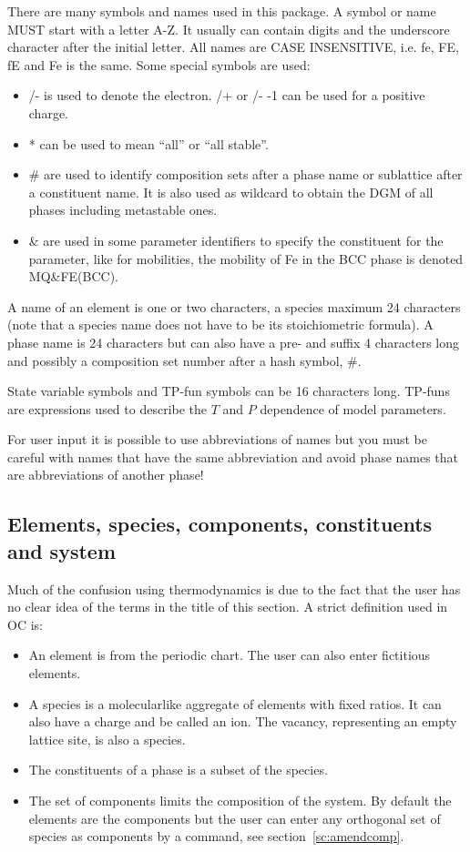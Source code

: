 \documentclass[11pt]{article}
\begin{document}
There are many symbols and names used in this package.  A symbol or
name MUST start with a letter A-Z.  It usually can contain digits and
the underscore character after the initial letter.  All names are CASE
INSENSITIVE, i.e. fe, FE, fE and Fe is the same.  Some special symbols
are used:

\begin{itemize}
\item /- is used to denote the electron. /+ or /- -1 can be used for a
  positive charge.
\item * can be used to mean ``all'' or ``all stable''.
\item \# are used to identify composition sets after a phase name or
  sublattice after a constituent name.  It is also used as wildcard
  to obtain the DGM of all phases including metastable ones.
\item \& are used in some parameter identifiers to specify the
  constituent for the parameter, like for mobilities, the mobility of
  Fe in the BCC phase is denoted MQ\&FE(BCC).
\end{itemize}

A name of an element is one or two characters, a species maximum 24
characters (note that a species name does not have to be its
stoichiometric formula).  A phase name is 24 characters but can also
have a pre- and suffix 4 characters long and possibly a composition
set number after a hash symbol, \#.

State variable symbols and TP-fun symbols can be 16 characters long.
TP-funs are expressions used to describe the $T$ and $P$ dependence of
model parameters.

For user input it is possible to use abbreviations of names but you
must be careful with names that have the same abbreviation and avoid
phase names that are abbreviations of another phase!

\hypertarget{Info elements}{}
\hypertarget{Info species}{}
\subsection{Elements, species, components, constituents and system}\label{sc:elements}

Much of the confusion using thermodynamics is due to the fact that the
user has no clear idea of the terms in the title of this section.  A
strict definition used in OC is:
\begin{itemize}
\item An element is from the periodic chart.  The user can also enter
  fictitious elements.
\item A species is a molecularlike aggregate of elements with fixed
  ratios.  It can also have a charge and be called an ion.  The
  vacancy, representing an empty lattice site, is also a species.
\item The constituents of a phase is a subset of the species.
\item The set of components limits the composition of the system.  By
  default the elements are the components but the user can enter any
  orthogonal set of species as components by a command, see
  section~\ref{sc:amendcomp}.
\end{itemize}
\end{document}

